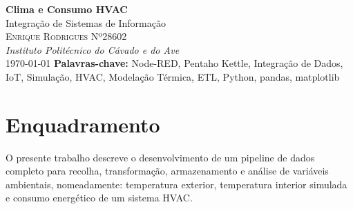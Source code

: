 \documentclass[a4paper, 12pt]{article} %
\renewcommand{\maketitle}{
\begin{titlepage}
\begin{center}
\vspace*{1cm}
{\Huge\textbf{Clima e Consumo HVAC}}\\[0.5cm] %
{\Large Integração de Sistemas de Informação}\\[2cm] %
{\large \textsc{
	Enrique Rodrigues Nº28602}}\\[0.5cm] %
{\textit{Instituto Politécnico do Cávado e do Ave}}\\[1.5cm] %
{\large \today} %
\vfill
\textbf{Palavras-chave:} Node-RED, Pentaho Kettle, Integração de Dados, IoT, Simulação, HVAC, Modelação Térmica, ETL, Python, pandas, matplotlib
\end{center}
\end{titlepage}
}
\begin{document}
\maketitle %


\renewcommand{\abstractname}{Summary} %





\newpage
\renewcommand{\contentsname}{Índice}
\tableofcontents




\newpage
\section{Enquadramento}

O presente trabalho descreve o desenvolvimento de um pipeline de dados completo para recolha, transformação, armazenamento e análise de variáveis ambientais, nomeadamente:
temperatura exterior, temperatura interior simulada e consumo energético de um sistema HVAC.
\end{document}
